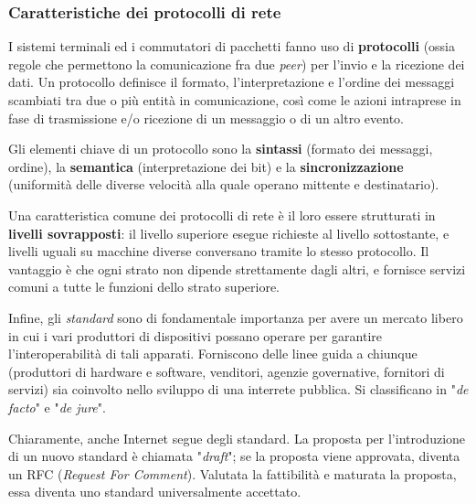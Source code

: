     \subsubsection{Caratteristiche dei protocolli di rete}
    
        I sistemi terminali ed i commutatori di pacchetti fanno uso di \textbf{protocolli} (ossia regole che permettono la comunicazione fra due \textit{peer}) per l’invio e la ricezione dei dati. Un protocollo definisce il formato, l'interpretazione e l’ordine dei messaggi scambiati tra due o più entità in comunicazione, così come le azioni intraprese in fase di trasmissione e/o ricezione di un messaggio o di un altro evento.
        
        \vspace{3mm}
        
        Gli elementi chiave di un protocollo sono la \textbf{sintassi} (formato dei messaggi, ordine), la \textbf{semantica} (interpretazione dei bit) e la \textbf{sincronizzazione} (uniformità delle diverse velocità alla quale operano mittente e destinatario).
        
        \vspace{3mm}
        
        Una caratteristica comune dei protocolli di rete è il loro essere strutturati in \textbf{livelli sovrapposti}: il livello superiore esegue richieste al livello sottostante, e livelli uguali su macchine diverse conversano tramite lo stesso protocollo. Il vantaggio è che ogni strato non dipende strettamente dagli altri, e fornisce servizi comuni a tutte le funzioni dello strato superiore. 
        
        \vspace{3mm}
        
        Infine, gli \textit{standard} sono di fondamentale importanza per avere un mercato libero in cui i vari produttori di dispositivi possano operare per garantire l’interoperabilità di tali apparati. Forniscono delle linee guida a chiunque (produttori di hardware e software, venditori, agenzie governative, fornitori di servizi) sia coinvolto nello sviluppo di una interrete pubblica. Si classificano in "\textit{de facto}" e "\textit{de jure}". 
        
        Chiaramente, anche Internet segue degli standard. La proposta per l'introduzione di un nuovo standard è chiamata "\textit{draft}"; se la proposta viene approvata, diventa un RFC (\textit{Request For Comment}). Valutata la fattibilità e maturata la proposta, essa diventa uno standard universalmente accettato.
